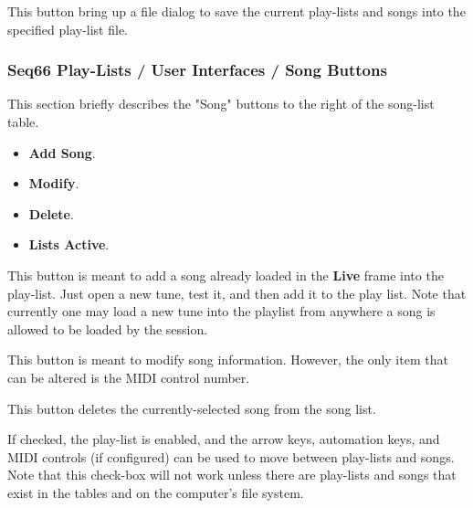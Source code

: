    This button bring up a file dialog to save the current play-lists and songs
   into the specified play-list file.

\subsubsection{Seq66 Play-Lists / User Interfaces / Song Buttons}
\label{subsubsec:playlist_ui_song_buttons}

   This section briefly describes the "Song" buttons to the right of the
   song-list table.

   \begin{itemize}
      \item \textbf{Add Song}.
      \item \textbf{Modify}.
      \item \textbf{Delete}.
      \item \textbf{Lists Active}.
   \end{itemize}

   \setcounter{ItemCounter}{0}      %


   This button is meant to add a song already loaded in the \textbf{Live} frame
   into the play-list.  Just open a new tune, test it, and then add it to the
   play list.  Note that currently one may load a new tune into the playlist
   from anywhere a song is allowed to be loaded by the session.

   This button is meant to modify song information.  However, the only item
   that can be altered is the MIDI control number.

   This button deletes the currently-selected song from the song list.

   If checked, the play-list is enabled, and the arrow keys, automation keys,
   and MIDI controls (if configured) can be used to move between play-lists and
   songs.
   Note that this check-box will not work unless there are play-lists and songs
   that exist in the tables and on the computer's file system.

